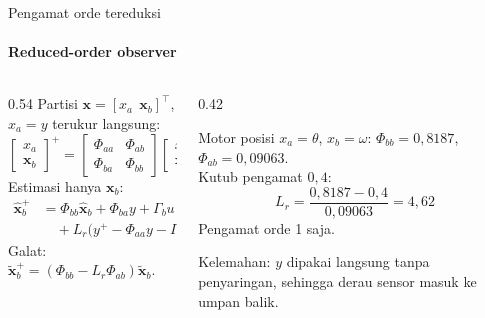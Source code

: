 \documentclass[aspectratio=169,10pt]{beamer}
\begin{document}
\begin{frame}{Pengamat orde tereduksi}
	\framesubtitle{Reduced-order observer}
	\begin{columns}[T]
		\begin{column}{0.54\textwidth}
			\small
			Partisi $\mathbf{x} = [x_a\ \ \mathbf{x}_b]^\top$, $x_a = y$ terukur langsung:
			\[
				\begin{bmatrix}x_a\\ \mathbf{x}_b\end{bmatrix}^{\!+} = \begin{bmatrix}\Phi_{aa} & \Phi_{ab}\\ \Phi_{ba} & \Phi_{bb}\end{bmatrix}\begin{bmatrix}x_a\\ \mathbf{x}_b\end{bmatrix} + \begin{bmatrix}\Gamma_a\\ \Gamma_b\end{bmatrix}u
			\]
			Estimasi hanya $\mathbf{x}_b$:
			\begin{align*}
				\hat{\mathbf{x}}_b^+ &= \Phi_{bb}\hat{\mathbf{x}}_b + \Phi_{ba}y + \Gamma_bu \\
				&\quad + L_r\big(y^+ - \Phi_{aa}y - \Gamma_au - \Phi_{ab}\hat{\mathbf{x}}_b\big)
			\end{align*}
			Galat: $\tilde{\mathbf{x}}_b^+ = (\Phi_{bb} - L_r\Phi_{ab})\tilde{\mathbf{x}}_b$.
		\end{column}
		\begin{column}{0.42\textwidth}
			\begin{exampleblock}{Motor posisi}
				\small
				$x_a = \theta$, $x_b = \omega$: $\Phi_{bb} = 0{,}8187$, $\Phi_{ab} = 0{,}09063$.\\[3pt]
				Kutub pengamat $0{,}4$:
				\[
					L_r = \frac{0{,}8187 - 0{,}4}{0{,}09063} = 4{,}62
				\]
				Pengamat orde 1 saja.
			\end{exampleblock}
			{\scriptsize Kelemahan: $y$ dipakai langsung tanpa penyaringan, sehingga derau sensor masuk ke umpan balik.}
		\end{column}
	\end{columns}
\end{frame}
\end{document}
